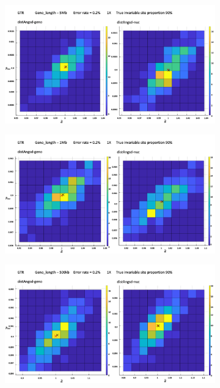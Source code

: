 \documentclass{article}
\begin{document}
\begin{figure}
\begin{subfigure}{.5\textwidth}
  \centering
  \includegraphics[width=.99\linewidth]{5M90.png}  
  \caption{}
  \label{fig:2D90s1}
\end{subfigure}
\begin{subfigure}{.5\textwidth}
  \centering
  \includegraphics[width=.99\linewidth]{1M90.png}  
  \caption{}
  \label{fig:2D90s2}
\end{subfigure}
\newline
\begin{subfigure}{.5\textwidth}
  \centering
  \includegraphics[width=.99\linewidth]{500k90.png}  

\end{subfigure}
\end{figure}
\end{document}
